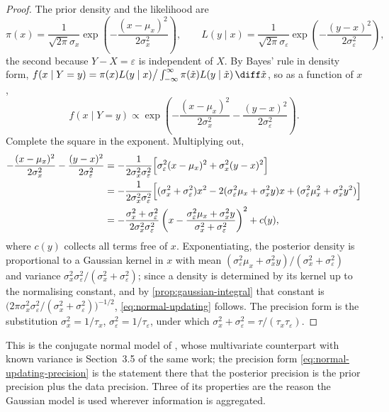 \begin{proof}
	The prior density and the likelihood are
	\[
		\pi(x)=\frac{1}{\sqrt{2\pi}\sigma_x}
		\exp\!\left(-\frac{(x-\mu_x)^{2}}{2\sigma_x^{2}}\right),
		\qquad
		L(y\mid x)=\frac{1}{\sqrt{2\pi}\sigma_\varepsilon}
		\exp\!\left(-\frac{(y-x)^{2}}{2\sigma_\varepsilon^{2}}\right),
	\]
	the second because $Y-X=\varepsilon$ is independent of $X$. By Bayes' rule in
	density form,
	$f(x\mid Y=y)=\pi(x)L(y\mid x)\big/\int_{-\infty}^{\infty}
		\pi(\tilde x)L(y\mid\tilde x)\,\diff\tilde x$, so as a function of $x$,
	\[
		f(x\mid Y=y)\propto
		\exp\!\left(-\frac{(x-\mu_x)^{2}}{2\sigma_x^{2}}
		-\frac{(y-x)^{2}}{2\sigma_\varepsilon^{2}}\right).
	\]
	Complete the square in the exponent. Multiplying out,
	\begin{align*}
		-\frac{(x-\mu_x)^{2}}{2\sigma_x^{2}}-\frac{(y-x)^{2}}{2\sigma_\varepsilon^{2}}
		 & =-\frac{1}{2\sigma_x^{2}\sigma_\varepsilon^{2}}
		\Bigl[\sigma_\varepsilon^{2}(x-\mu_x)^{2}+\sigma_x^{2}(y-x)^{2}\Bigr]         \\
		 & =-\frac{1}{2\sigma_x^{2}\sigma_\varepsilon^{2}}
		\Bigl[(\sigma_x^{2}+\sigma_\varepsilon^{2})x^{2}
		-2(\sigma_\varepsilon^{2}\mu_x+\sigma_x^{2}y)x
		+(\sigma_\varepsilon^{2}\mu_x^{2}+\sigma_x^{2}y^{2})\Bigr]                    \\
		 & =-\frac{\sigma_x^{2}+\sigma_\varepsilon^{2}}
		{2\sigma_x^{2}\sigma_\varepsilon^{2}}
		\left(x-\frac{\sigma_\varepsilon^{2}\mu_x+\sigma_x^{2}y}
		{\sigma_x^{2}+\sigma_\varepsilon^{2}}\right)^{2}+c(y),
	\end{align*}
	where $c(y)$ collects all terms free of $x$. Exponentiating, the posterior
	density is proportional to a Gaussian kernel in $x$ with mean
	$(\sigma_\varepsilon^{2}\mu_x+\sigma_x^{2}y)/(\sigma_x^{2}+\sigma_\varepsilon^{2})$
	and variance
	$\sigma_x^{2}\sigma_\varepsilon^{2}/(\sigma_x^{2}+\sigma_\varepsilon^{2})$; since
	a density is determined by its kernel up to the normalising constant, and by
	\autoref{prop:gaussian-integral} that constant is
	$\bigl(2\pi\sigma_x^{2}\sigma_\varepsilon^{2}/
		(\sigma_x^{2}+\sigma_\varepsilon^{2})\bigr)^{-1/2}$,
	\eqref{eq:normal-updating} follows. The precision form is the substitution
	$\sigma_x^{2}=1/\tau_x$, $\sigma_\varepsilon^{2}=1/\tau_\varepsilon$, under which
	$\sigma_x^2+\sigma_\varepsilon^2=\tau/(\tau_x\tau_\varepsilon)$.
\end{proof}

This is the conjugate normal model of \textcite[Sec.~2.5, pp.~39--42]{gelman2013bayesian},
whose multivariate counterpart with known variance is Section~3.5 of the same
work; the precision form \eqref{eq:normal-updating-precision} is the statement
there that the posterior precision is the prior precision plus the data
precision. Three of its properties are the reason the Gaussian model is used
wherever information is aggregated.

